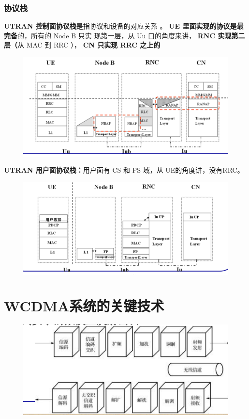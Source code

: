 \subsubsection{协议栈}
\textbf{UTRAN 控制面协议栈}是指协议和设备的对应关系
。 \textbf{UE 里面实现的协议是最完备}的，所有的 Node B 只实
现第一层，从 Uu 口的角度来讲，\textbf{ RNC 实现第二层（}从
MAC 到 RRC ），\textbf{ CN 只实现 RRC 之上的}
\begin{figure}[H]
	\centering
	\includegraphics[width=0.7\linewidth]{figures/screenshot015}
	\caption{}
	\label{fig:screenshot015}
\end{figure}
\textbf{UTRAN 用户面协议栈：}用户面有 CS 和 PS 域，从 UE的角度讲，没有RRC。
\begin{figure}[H]
	\centering
	\includegraphics[width=0.7\linewidth]{figures/screenshot016}
	\caption{}
	\label{fig:screenshot016}
\end{figure}
\section{WCDMA系统的关键技术}
\begin{figure}[H]
	\centering
	\includegraphics[width=0.7\linewidth]{figures/screenshot017}
	\caption{}
	\label{fig:screenshot017}
\end{figure}


